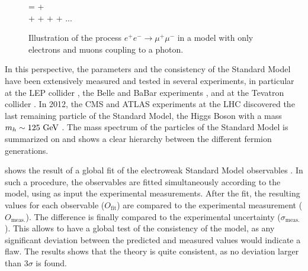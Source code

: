     \begin{figure}
        \centering
        {
            =
            +
            \nonumber
            \\
            +
            +
            +
            +
            ...
            \nonumber
        }
        \caption{Illustration of the process $e^+ e^- \rightarrow \mu^+ \mu^-$
        in a model with only electrons and muons coupling to a photon. \label{fig:perturbativeDevelopment}}
    \end{figure}

    In this perspective, the parameters and the consistency of the Standard
    Model have been extensively measured and tested in several experiments, in particular
    at the LEP collider \cite{LEP}, the Belle and BaBar experiments \cite{BelleAndBabar}, and at the Tevatron collider \cite{Tevatron}. In 2012,
    the CMS and ATLAS experiments at the LHC discovered the last remaining particle of the
    Standard Model, the Higgs Boson with a mass $m_{h} \sim 125~\text{GeV}$ \cite{CMSHiggs,ATLASHiggs}. The mass
    spectrum of the particles of the Standard Model is summarized on  and
    shows a clear hierarchy between the different fermion generations.

     shows the result of a global fit of the electroweak
    Standard Model observables \cite{GFitter}. In such a procedure, the observables are
    fitted simultaneously according to the model, using as input the experimental measurements.
    After the fit, the resulting values for each observable ($O_\text{fit}$) are compared to
    the experimental measurement ($O_\text{meas.}$). The difference is finally compared to
    the experimental uncertainty ($\sigma_\text{meas.}$). This allows to have a global test of the consistency of
    the model, as any significant deviation between the predicted and measured values would
    indicate a flaw. The results shows that the theory is quite consistent, as no deviation
    larger than 3$\sigma$ is found.

